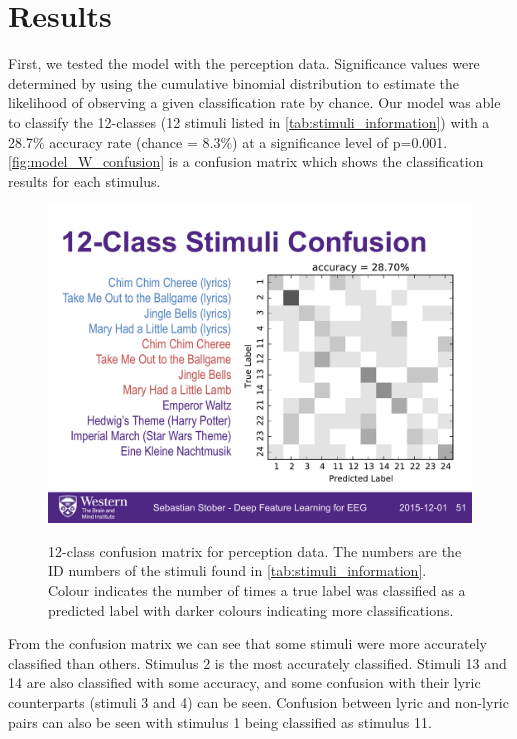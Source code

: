 \section{Results}
First, we tested the model with the perception data. 
Significance values were determined by using the cumulative binomial distribution to estimate the likelihood of observing a given classification rate by chance. 
Our model was able to classify the 12-classes (12 stimuli listed in \autoref{tab:stimuli_information}) with a 28.7\% accuracy rate (chance = 8.3\%) at a significance level of p=0.001. 
\autoref{fig:model_W_confusion} is a confusion matrix which shows the classification results for each stimulus.
\begin{figure}[htb] 
  \begin{center}
    \includegraphics[width=.75\textwidth,keepaspectratio=true]{Figures/model_W_confusion}
   \\\vspace{-0.8em}
    \caption{12-class confusion matrix for perception data. The numbers are the ID numbers of the stimuli found in \autoref{tab:stimuli_information}. Colour indicates the number of times a true label was classified as a predicted label with darker colours indicating more classifications.}
    \label{fig:model_W_confusion}
  \end{center}
\end{figure}
From the confusion matrix we can see that some stimuli were more accurately classified than others. 
Stimulus 2 is the most accurately classified. 
Stimuli 13 and 14 are also classified with some accuracy, and some confusion with their lyric counterparts (stimuli 3 and 4) can be seen.
Confusion between lyric and non-lyric pairs can also be seen with stimulus 1 being classified as stimulus 11.

